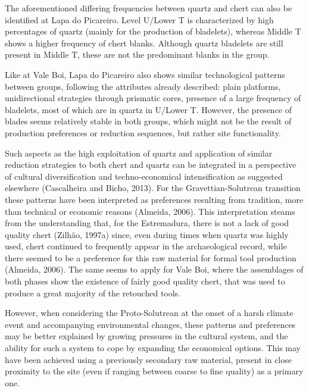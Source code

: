 \documentclass[12pt,twoside]{reedthesis}
\begin{document}
The aforementioned differing frequencies between quartz and chert can also be identified at Lapa do Picareiro. Level U/Lower T is characterized by high percentages of quartz (mainly for the production of bladelets), whereas Middle T shows a higher frequency of chert blanks. Although quartz bladelets are still present in Middle T, these are not the predominant blanks in the group.

Like at Vale Boi, Lapa do Picareiro also shows similar technological patterns between groups, following the attributes already described: plain platforms, unidirectional strategies through prismatic cores, presence of a large frequency of bladelets, most of which are in quartz in U/Lower T. However, the presence of blades seems relatively stable in both groups, which might not be the result of production preferences or reduction sequences, but rather site functionality.

Such aspects as the high exploitation of quartz and application of similar reduction strategies to both chert and quartz can be integrated in a perspective of cultural diversification and techno-economical intensification as suggested elsewhere (Cascalheira and Bicho, 2013). For the Gravettian-Solutrean transition these patterns have been interpreted as preferences resulting from tradition, more than technical or economic reasons (Almeida, 2006). This interpretation steams from the understanding that, for the Estremadura, there is not a lack of good quality chert (Zilhão, 1997a) since, even during times when quartz was highly used, chert continued to frequently appear in the archaeological record, while there seemed to be a preference for this raw material for formal tool production (Almeida, 2006). The same seems to apply for Vale Boi, where the assemblages of both phases show the existence of fairly good quality chert, that was used to produce a great majority of the retouched tools.

However, when considering the Proto-Solutrean at the onset of a harsh climate event and accompanying environmental changes, these patterns and preferences may be better explained by growing pressures in the cultural system, and the ability for such a system to cope by expanding the economical options. This may have been achieved using a previously secondary raw material, present in close proximity to the site (even if ranging between coarse to fine quality) as a primary one.
\end{document}
